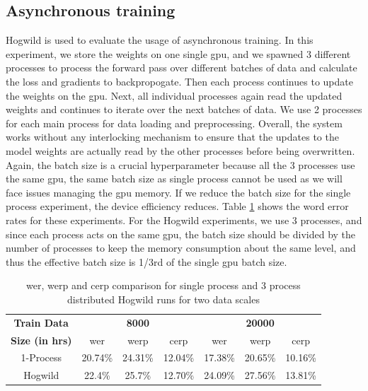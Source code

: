 \subsection{Asynchronous training}
Hogwild \cite{Niu2011HOGWILD:Descent} is used to evaluate the usage of asynchronous training. In this experiment, we store the weights on one single \acrshort{gpu}, and we spawned 3 different processes to process the forward pass over different batches of data and calculate the loss and gradients to backpropogate. Then each process continues to update the weights on the \acrshort{gpu}. Next, all individual processes again read the updated weights and continues to iterate over the next batches of data. We use 2 processes for each main process for data loading and preprocessing. Overall, the system works without any interlocking mechanism to ensure that the updates to the model weights are actually read by the other processes before being overwritten. Again, the batch size is a crucial hyperparameter because all the 3 processes use the same \acrshort{gpu}, the same batch size as single process cannot be used as we will face issues managing the \acrshort{gpu} memory. If we reduce the batch size for the single process experiment, the device efficiency reduces. Table \ref{table:wer_hog} shows the word error rates for these experiments. For the Hogwild experiments, we use 3 processes, and since each process acts on the same \acrshort{gpu}, the batch size should be divided by the number of processes to keep the memory consumption about the same level, and thus the effective batch size is 1/3rd of the single \acrshort{gpu} batch size.

\begin{table}[ht]
\centering
\begin{tabular}{c | c c c | c c c }
\hline
\textbf{Train Data} & \multicolumn{3}{c|}{\textbf{8000}} & \multicolumn{3}{c}{\textbf{20000}}\\\cline{2-7}
   \textbf{Size (in hrs)} & \acrshort{wer} & \acrshort{werp} & \acrshort{cerp} & \acrshort{wer} & \acrshort{werp} & \acrshort{cerp}\\
 \hline
  1-Process & 20.74\% & 24.31\% & 12.04\% & 17.38\% & 20.65\% & 10.16\%\\
  Hogwild & 22.4\% & 25.7\% & 12.70\% & 24.09\% & 27.56\% & 13.81\% \\
 \hline
\end{tabular}
\caption{\label{table:wer_hog} \acrshort{wer}, \acrshort{werp} and \acrshort{cerp} comparison for single process and 3 process distributed Hogwild runs for two data scales}
\end{table}

